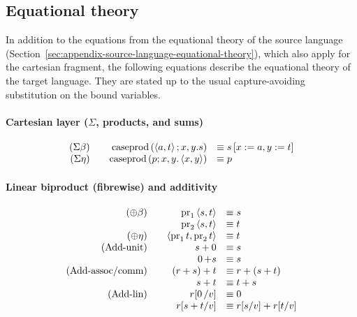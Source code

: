 \documentclass[11pt,a4paper]{article}
\theoremstyle{definition}
\theoremstyle{remark}
\providecommand{\casubst}[3]{#1[#3/#2]}
\begin{document}
\subsection{Equational theory}

In addition to the equations from the equational theory of the source language (Section~\ref{sec:appendix-source-language-equational-theory}), which also apply for the cartesian fragment, the following equations describe the equational theory of the target language. They are stated up to the usual capture-avoiding substitution on the bound variables.

\paragraph{Cartesian layer (\( \Sigma \), products, and sums)}

\begin{equation*}
  \begin{array}{rrl}
    \left( \Sigma \beta \right)
    &\quad
      \operatorname{caseprod}\left(\left\langle  a, t \right\rangle;x, y.s\right)
    &\equiv
      s \left[ x := a, y := t \right]
    \\
    \left( \Sigma \eta \right)
    &\quad
      \operatorname{caseprod}\left(p;x, y.\left\langle  x, y \right\rangle\right)
    &\equiv
      p
  \end{array}
\end{equation*}

\paragraph{Linear biproduct (fibrewise) and additivity}

\begin{equation*}
  \begin{array}{rrl}
    \left( \oplus \beta \right)
    &\quad
      \opn[b]{pr}_{1} \tuple{ s, t }
    &\equiv
      s
    \\
    &\quad
      \opn[b]{pr}_{2} \tuple{ s, t }
    &\equiv
      t
    \\
    \left( \oplus \eta \right)
    &\quad
      \tuple{ \opn[b]{pr}_{1} t, \opn[b]{pr}_{2} t }
    &\equiv
      t
    \\
    \left( \text{Add-unit} \right) 
    &\quad
      s + \opn[b]{0}
    &\equiv
      s
    \\
    &\quad
      \opn[b]{0} + s
    &\equiv
      s
    \\
    \left( \text{Add-assoc/comm} \right) 
    &\quad
      \left( r + s \right) + t
    &\equiv
      r + \left( s + t \right)
    \\
    &\quad
      s + t
    &\equiv
      t + s
    \\
    \left( \text{Add-lin} \right)
    &\quad
      \casubst{r}{v}{\opn[b]{0}}
    &\equiv
      \opn[b]{0}
    \\
    &\quad
      \casubst{r}{v}{s + t}
    &\equiv
      \casubst{r}{v}{s} + \casubst{r}{v}{t}
  \end{array}
\end{equation*}
\end{document}
